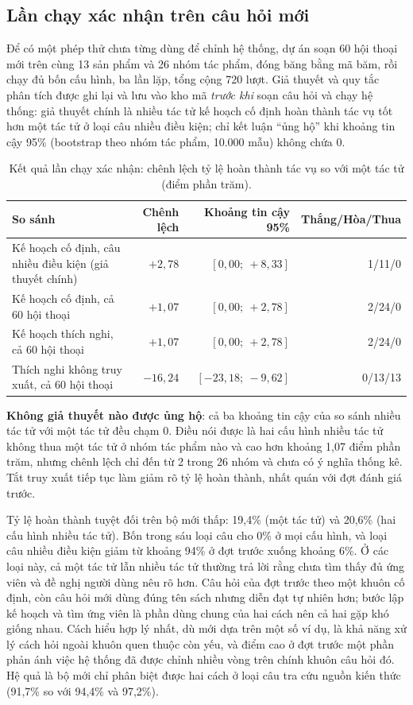 \subsection{Lần chạy xác nhận trên câu hỏi mới}
Để có một phép thử chưa từng dùng để chỉnh hệ thống, dự án soạn 60 hội thoại mới trên cùng 13 sản phẩm và 26 nhóm tác phẩm, đóng băng bằng mã băm, rồi chạy đủ bốn cấu hình, ba lần lặp, tổng cộng 720 lượt. Giả thuyết và quy tắc phân tích được ghi lại và lưu vào kho mã \textit{trước khi} soạn câu hỏi và chạy hệ thống: giả thuyết chính là nhiều tác tử kế hoạch cố định hoàn thành tác vụ tốt hơn một tác tử ở loại câu nhiều điều kiện; chỉ kết luận ``ủng hộ'' khi khoảng tin cậy 95\% (bootstrap theo nhóm tác phẩm, 10.000 mẫu) không chứa 0. 

\begin{table}[htbp]\small
\caption{Kết quả lần chạy xác nhận: chênh lệch tỷ lệ hoàn thành tác vụ so với một tác tử (điểm phần trăm).}
\begin{tabularx}{\linewidth}{Yrrr}\toprule
So sánh & Chênh lệch & Khoảng tin cậy 95\% & Thắng/Hòa/Thua\\\midrule
Kế hoạch cố định, câu nhiều điều kiện (giả thuyết chính) & $+2{,}78$ & $[0{,}00;\ +8{,}33]$ & 1/11/0\\
Kế hoạch cố định, cả 60 hội thoại & $+1{,}07$ & $[0{,}00;\ +2{,}78]$ & 2/24/0\\
Kế hoạch thích nghi, cả 60 hội thoại & $+1{,}07$ & $[0{,}00;\ +2{,}78]$ & 2/24/0\\
Thích nghi không truy xuất, cả 60 hội thoại & $-16{,}24$ & $[-23{,}18;\ -9{,}62]$ & 0/13/13\\\bottomrule
\end{tabularx}
\end{table}

\textbf{Không giả thuyết nào được ủng hộ}: cả ba khoảng tin cậy của so sánh nhiều tác tử với một tác tử đều chạm 0. Điều nói được là hai cấu hình nhiều tác tử không thua một tác tử ở nhóm tác phẩm nào và cao hơn khoảng 1,07 điểm phần trăm, nhưng chênh lệch chỉ đến từ 2 trong 26 nhóm và chưa có ý nghĩa thống kê. Tắt truy xuất tiếp tục làm giảm rõ tỷ lệ hoàn thành, nhất quán với đợt đánh giá trước.

Tỷ lệ hoàn thành tuyệt đối trên bộ mới thấp: 19,4\% (một tác tử) và 20,6\% (hai cấu hình nhiều tác tử). Bốn trong sáu loại câu cho 0\% ở mọi cấu hình, và loại câu nhiều điều kiện giảm từ khoảng 94\% ở đợt trước xuống khoảng 6\%. Ở các loại này, cả một tác tử lẫn nhiều tác tử thường trả lời rằng chưa tìm thấy đủ ứng viên và đề nghị người dùng nêu rõ hơn. Câu hỏi của đợt trước theo một khuôn cố định, còn câu hỏi mới dùng đúng tên sách nhưng diễn đạt tự nhiên hơn; bước lập kế hoạch và tìm ứng viên là phần dùng chung của hai cách nên cả hai gặp khó giống nhau. Cách hiểu hợp lý nhất, dù mới dựa trên một số ví dụ, là khả năng xử lý cách hỏi ngoài khuôn quen thuộc còn yếu, và điểm cao ở đợt trước một phần phản ánh việc hệ thống đã được chỉnh nhiều vòng trên chính khuôn câu hỏi đó. Hệ quả là bộ mới chỉ phân biệt được hai cách ở loại câu tra cứu nguồn kiến thức (91,7\% so với 94,4\% và 97,2\%).

